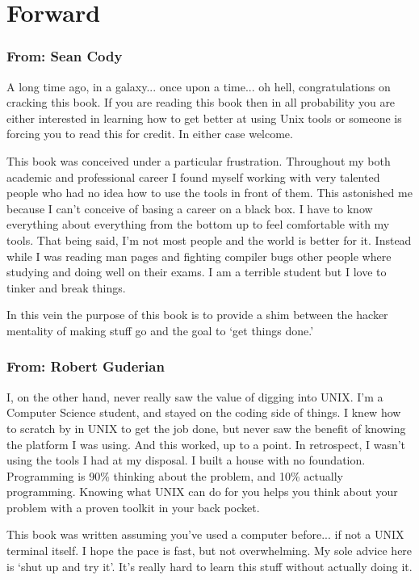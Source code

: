 \chapter{Forward}

\subsection{From: Sean Cody}
A long time ago, in a galaxy... once upon a time... oh hell, congratulations on cracking this book. 
 If you are reading this book then in all probability you
are either interested in learning how to get better at using Unix tools or 
someone is forcing you to read this for credit.  In either case welcome.

This book was conceived under a particular frustration.  Throughout my
both academic and professional career I found myself working with very talented
people who had no idea how to use the tools in front of them.  This astonished
me because I can't conceive of basing a career on a black box.  I have to know
everything about everything from the bottom up to feel comfortable with my 
tools.  That being said, I'm not most people and the world is better for it.  
Instead while I was reading man pages and fighting compiler bugs other people 
where studying and doing well on their exams.  I am a terrible student but 
I love to tinker and break things.

In this vein the purpose of this book is to provide a shim between the hacker
mentality of making stuff go and the goal to `get things done.'

\subsection{From: Robert Guderian}

I, on the other hand, never really saw the value of digging into UNIX. I'm
a Computer Science student, and stayed on the coding side of things. 
I knew how to scratch by in UNIX to get the job done, but never saw
the benefit of knowing the platform I was using. And this worked, up to a point.
In retrospect, I wasn't using the tools I had at my disposal. I built a 
house with no foundation. Programming is 90\% thinking about the problem, and 10\%  actually
programming. Knowing what UNIX can do for you helps you think about your problem with a
proven toolkit in your back pocket.

This book was written assuming you've used a computer before... if not a UNIX terminal itself. 
I hope the pace is fast, but not overwhelming. My sole advice here is `shut up and try it'. 
It's really hard to learn this stuff without actually doing it.
